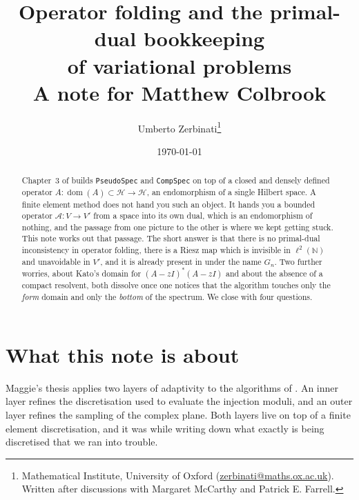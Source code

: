 \documentclass[11pt,a4paper]{article}
\title{Operator folding and the primal-dual bookkeeping\\ of variational
       problems\\[2ex]
       \large A note for Matthew Colbrook}
\author{Umberto Zerbinati\thanks{Mathematical Institute, University of Oxford
  (\href{mailto:zerbinati@maths.ox.ac.uk}{zerbinati@maths.ox.ac.uk}).  Written
  after discussions with Margaret McCarthy and Patrick E. Farrell.}}
\date{\today}
\theoremstyle{plain}
\newcommand{\N}{\mathbb{N}}
\newcommand{\Hb}{\mathcal{H}}
\newcommand{\Vb}{V}
\newcommand{\Aop}{\mathcal{A}}
\DeclareMathOperator{\dom}{dom}
\begin{document}
\maketitle

\begin{abstract}
Chapter~3 of \cite{Colbrook2026} builds \texttt{PseudoSpec} and \texttt{CompSpec}
on top of a closed and densely defined operator $A \colon \dom(A) \subset \Hb
\to \Hb$, an endomorphism of a single Hilbert space.  A finite element method
does not hand you such an object.  It hands you a bounded operator $\Aop \colon
\Vb \to \Vb'$ from a space into its own dual, which is an endomorphism of
nothing, and the passage from one picture to the other is where we kept getting
stuck.  This note works
out that passage.  The short answer is that there is no primal-dual
inconsistency in operator folding, there is a Riesz map which is invisible in
$\ell^2(\N)$ and unavoidable in $\Vb'$, and it is already present in
\cite[Algorithm~3.4]{Colbrook2026} under the name $G_n$.  Two further worries,
about Kato's domain for $(A-zI)^*(A-zI)$ and about the absence of a compact
resolvent, both dissolve once one notices that the algorithm touches only the
\emph{form} domain and only the \emph{bottom} of the spectrum.  We close with
four questions.
\end{abstract}

\tableofcontents

\section{What this note is about}
\label{sec:purpose}

Maggie's thesis applies two layers of adaptivity to the algorithms of
\cite[Chapter~3]{Colbrook2026}.  An inner layer refines the discretisation used
to evaluate the injection moduli, and an outer layer refines the sampling of
the complex plane.  Both layers live on top of a finite element discretisation,
and it was while writing down what exactly is being discretised that we ran into
trouble.
\end{document}
